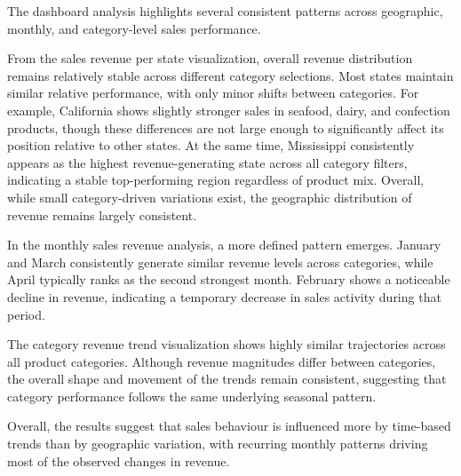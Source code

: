 The dashboard analysis highlights several consistent patterns across geographic, monthly, and category-level sales performance.

\vspace{1em}

From the sales revenue per state visualization, overall revenue distribution remains relatively stable across different category selections. Most states maintain similar relative performance, with only minor shifts between categories. For example, California shows slightly stronger sales in seafood, dairy, and confection products, though these differences are not large enough to significantly affect its position relative to other states. At the same time, Mississippi consistently appears as the highest revenue-generating state across all category filters, indicating a stable top-performing region regardless of product mix. Overall, while small category-driven variations exist, the geographic distribution of revenue remains largely consistent.

\vspace{1em}

In the monthly sales revenue analysis, a more defined pattern emerges. January and March consistently generate similar revenue levels across categories, while April typically ranks as the second strongest month. February shows a noticeable decline in revenue, indicating a temporary decrease in sales activity during that period.

\vspace{1em}

The category revenue trend visualization shows highly similar trajectories across all product categories. Although revenue magnitudes differ between categories, the overall shape and movement of the trends remain consistent, suggesting that category performance follows the same underlying seasonal pattern.

\vspace{1em}

Overall, the results suggest that sales behaviour is influenced more by time-based trends than by geographic variation, with recurring monthly patterns driving most of the observed changes in revenue.
